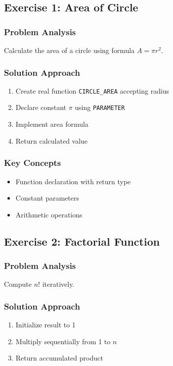 \documentclass{book}
\begin{document}
\subsection*{Exercise 1: Area of Circle}
\subsubsection*{Problem Analysis}
Calculate the area of a circle using formula \( A = \pi r^2 \).

\subsubsection*{Solution Approach}
\begin{enumerate}
\item Create real function \texttt{CIRCLE\_AREA} accepting radius
\item Declare constant \(\pi\) using \texttt{PARAMETER}
\item Implement area formula
\item Return calculated value
\end{enumerate}

\subsubsection*{Key Concepts}
\begin{itemize}
\item Function declaration with return type
\item Constant parameters
\item Arithmetic operations
\end{itemize}

\subsection*{Exercise 2: Factorial Function}
\subsubsection*{Problem Analysis}
Compute \( n! \) iteratively.

\subsubsection*{Solution Approach}
\begin{enumerate}
\item Initialize result to 1
\item Multiply sequentially from 1 to \( n \)
\item Return accumulated product
\end{enumerate}
\end{document}
